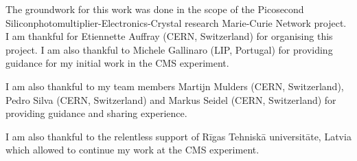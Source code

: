 The groundwork for this work was done in the scope of the Picosecond Siliconphotomultiplier-Electronics-Crystal research Marie-Curie Network project. I am thankful for Etiennette Auffray (CERN, Switzerland) for organising this project. I am also thankful to Michele Gallinaro (LIP, Portugal) for providing guidance for my initial work in the CMS experiment.

I am also thankful to my team members Martijn Mulders (CERN, Switzerland), Pedro Silva (CERN, Switzerland) and Markus Seidel (CERN, Switzerland) for providing guidance and sharing experience.

I am also thankful to the relentless support of Rīgas Tehniskā universitāte, Latvia which allowed to continue my work at the CMS experiment.
